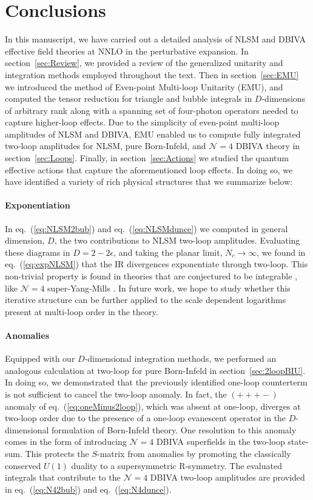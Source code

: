 \documentclass[12pt,letter]{article}
\def\sect#1{section~\ref{#1}}
\def\eqn#1{eq.~(\ref{#1})}
\begin{document}
\section{Conclusions}\label{sec:Discussion}
In this manuscript, we have carried out a detailed analysis of NLSM and DBIVA effective field theories at NNLO in the perturbative expansion. In \sect{sec:Review}, we provided a review of the generalized unitarity and integration methods employed throughout the text. Then in \sect{sec:EMU} we introduced the method of Even-point Multi-loop Unitarity (EMU), and computed the tensor reduction for triangle and bubble integrals in $D$-dimensions of arbitrary rank along with a spanning set of four-photon operators needed to capture higher-loop effects. Due to the simplicity of even-point multi-loop amplitudes of NLSM and DBIVA, EMU enabled us to compute fully integrated two-loop amplitudes for NLSM, pure Born-Infeld, and $\mathcal{N}=4$ DBIVA theory in \sect{sec:Loops}. Finally, in \sect{sec:Actions} we studied the quantum effective actions that capture the aforementioned loop effects. In doing so, we have identified a variety of rich physical structures that we summarize below: 
\paragraph{\textbf{Exponentiation}} In \eqn{eq:NLSM2bub} and \eqn{eq:NLSMdunce} we computed in general dimension, $D$, the two contributions to NLSM two-loop amplitudes. Evaluating these diagrams in $D=2-2\epsilon$, and taking the planar limit, $N_c \rightarrow \infty$, we found in \eqn{eq:expNLSM} that the IR divergences exponentiate through two-loop. This non-trivial property is found in theories that are conjectured to be integrable \cite{Shankar:1977cm,Zamolodchikov:1977nu,Zamolodchikov:1978xm, Komatsu:2019hgc}, like $\mathcal{N}=4$ super-Yang-Mills \cite{Anastasiou:2003kj,Bern:2005iz}. In future work, we hope to study whether this iterative structure can be further applied to the scale dependent logarithms present at multi-loop order in the theory. 
\paragraph{\textbf{Anomalies}} Equipped with our $D$-dimensional integration methods, we performed an analogous calculation at two-loop for pure Born-Infeld in \sect{sec:2loopBIU}. In doing so, we demonstrated that the previously identified one-loop counterterm is not sufficient to cancel the two-loop anomaly. In fact, the $(+++-)$ anomaly of \eqn{eq:oneMinus2loop}, which was absent at one-loop, diverges at two-loop order due to the presence of a one-loop evanescent operator in the $D$-dimensional formulation of Born-Infeld theory. One resolution to this anomaly comes in the form of introducing $\mathcal{N}=4$ DBIVA superfields in the two-loop state-sum. This protects the $S$-matrix from anomalies by promoting the classically conserved $U(1)$ duality to a supersymmetric R-symmetry. The evaluated integrals that contribute to the $\mathcal{N}=4$ DBIVA two-loop amplitudes are provided in \eqn{eq:N42bub} and \eqn{eq:N4dunce}. 
\end{document}
